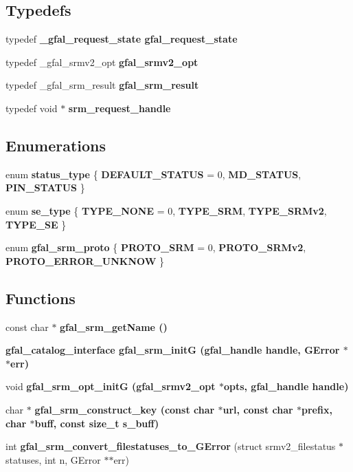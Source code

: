 \subsection*{Typedefs}
\begin{CompactItemize}
\item 
typedef \bf{\_\-gfal\_\-request\_\-state} \bf{gfal\_\-request\_\-state}
\item 
typedef \_\-gfal\_\-srmv2\_\-opt \textbf{gfal\_\-srmv2\_\-opt}\label{gfal__common__srm_8h_a3bcd91e6251d7f36da98c2145fa117b}

\item 
typedef \_\-gfal\_\-srm\_\-result \textbf{gfal\_\-srm\_\-result}\label{gfal__common__srm_8h_9098edc68db720cb1ae7849f51b5191b}

\item 
typedef void $\ast$ \textbf{srm\_\-request\_\-handle}\label{gfal__common__srm_8h_87f5a32879caba96e260c7e70c16888f}

\end{CompactItemize}
\subsection*{Enumerations}
\begin{CompactItemize}
\item 
enum \textbf{status\_\-type} \{ \textbf{DEFAULT\_\-STATUS} =  0, 
\textbf{MD\_\-STATUS}, 
\textbf{PIN\_\-STATUS}
 \}
\item 
enum \textbf{se\_\-type} \{ \textbf{TYPE\_\-NONE} =  0, 
\textbf{TYPE\_\-SRM}, 
\textbf{TYPE\_\-SRMv2}, 
\textbf{TYPE\_\-SE}
 \}
\item 
enum \textbf{gfal\_\-srm\_\-proto} \{ \textbf{PROTO\_\-SRM} = 0, 
\textbf{PROTO\_\-SRMv2}, 
\textbf{PROTO\_\-ERROR\_\-UNKNOW}
 \}
\end{CompactItemize}
\subsection*{Functions}
\begin{CompactItemize}
\item 
const char $\ast$ \bf{gfal\_\-srm\_\-get\-Name} ()
\item 
\bf{gfal\_\-catalog\_\-interface} \textbf{gfal\_\-srm\_\-init\-G} (gfal\_\-handle handle, GError $\ast$$\ast$err)\label{gfal__common__srm_8h_0f8ff443c68a9f6177d717ad52b7d5a5}

\item 
void \bf{gfal\_\-srm\_\-opt\_\-init\-G} (gfal\_\-srmv2\_\-opt $\ast$opts, gfal\_\-handle handle)
\item 
char $\ast$ \bf{gfal\_\-srm\_\-construct\_\-key} (const char $\ast$url, const char $\ast$prefix, char $\ast$buff, const size\_\-t s\_\-buff)
\item 
int \textbf{gfal\_\-srm\_\-convert\_\-filestatuses\_\-to\_\-GError} (struct srmv2\_\-filestatus $\ast$statuses, int n, GError $\ast$$\ast$err)\label{gfal__common__srm_8h_9177e8f96da30fda27c71daead3ff4e8}

\end{CompactItemize}


